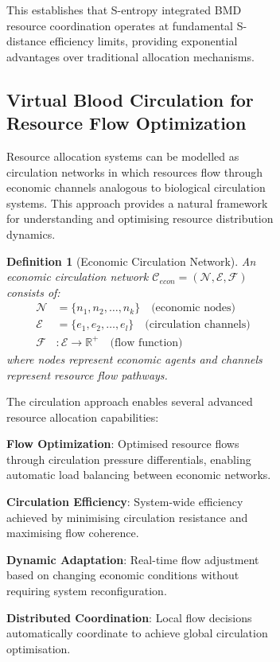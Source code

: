\documentclass[12pt,a4paper]{article}
\newtheorem{definition}[theorem]{Definition}
\begin{document}
\begin{figure}[H]
\begin{figure}[H]
This establishes that S-entropy integrated BMD resource coordination operates at fundamental S-distance efficiency limits, providing exponential advantages over traditional allocation mechanisms.

\subsection{Virtual Blood Circulation for Resource Flow Optimization}

Resource allocation systems can be modelled as circulation networks in which resources flow through economic channels analogous to biological circulation systems. This approach provides a natural framework for understanding and optimising resource distribution dynamics.

\begin{definition}[Economic Circulation Network]
An economic circulation network $\mathcal{C}_{econ} = (\mathcal{N}, \mathcal{E}, \mathcal{F})$ consists of:
\begin{align}
\mathcal{N} &= \{n_1, n_2, \ldots, n_k\} \quad \text{(economic nodes)} \\
\mathcal{E} &= \{e_1, e_2, \ldots, e_l\} \quad \text{(circulation channels)} \\
\mathcal{F} &: \mathcal{E} \rightarrow \mathbb{R}^+ \quad \text{(flow function)}
\end{align}
where nodes represent economic agents and channels represent resource flow pathways.
\end{definition}

The circulation approach enables several advanced resource allocation capabilities:

\textbf{Flow Optimization}: Optimised resource flows through circulation pressure differentials, enabling automatic load balancing between economic networks.

\textbf{Circulation Efficiency}: System-wide efficiency achieved by minimising circulation resistance and maximising flow coherence.

\textbf{Dynamic Adaptation}: Real-time flow adjustment based on changing economic conditions without requiring system reconfiguration.

\textbf{Distributed Coordination}: Local flow decisions automatically coordinate to achieve global circulation optimisation.


\end{figure}
\end{figure}
\end{document}
